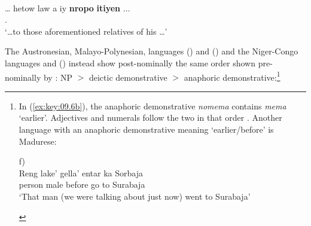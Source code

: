 \documentclass[output=paper]{langsci/langscibook}
\begin{document}
\ea {} \parencite[99]{Hamel1994}\label{ex:key:09.5}\\
    \gll \dots{} hetow    law        a  iy  \textbf{nropo} \textbf{itiyen} ... \\
		{} \Tpl.\Cl{} \Rel{} \Poss{} \Tsg{} \textbf{\Dem{}} \textbf{\Dem{}} {}\\
	\glt ‘\dots  to those aforementioned relatives of his \dots’
\z

The Austronesian, Malayo-Polynesian, languages 
(\citealt{Eades2005}) and  (\citealt{Brown2005}) and the
Niger-Congo languages  \citep{Fabre2004} and
 (\citealt{Paluku1998}) instead show post-nominally
the same order shown pre-nominally by : NP $>$ deictic demonstrative
$>$ anaphoric demonstrative:\footnote{In (\ref{ex:key:09.6b}), the anaphoric
    demonstrative \emph{nomema} contains \emph{mema} ‘earlier’.  Adjectives and
    numerals follow the two  in that order
    \parencite[412]{Brown2001}.  Another language with an anaphoric
    demonstrative meaning ‘earlier/before’ is Madurese:

        \begin{exe}  \parencite[192]{Davies2010}f)\\ %
                \gll Reng   lake’ gella’ entar ka Sorbaja \\
                     person male before   go  to Surabaja \\
                \glt ‘That man (we were talking about just now) went to
            Surabaja’
        \end{exe}}
\end{document}
